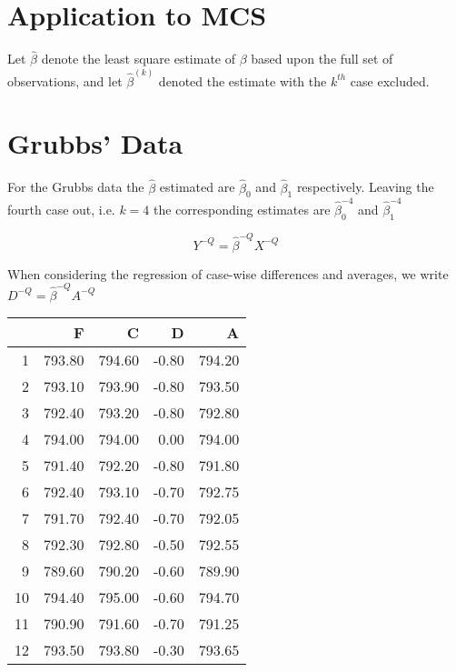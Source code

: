\documentclass[12pt, a4paper]{report}
\theoremstyle{plain}
\theoremstyle{definition}
\theoremstyle{remark}
\begin{document}

\section{Application to MCS} %

Let $\hat{\beta}$ denote the least square estimate of $\beta$
based upon the full set of observations, and let
$\hat{\beta}^{(k)}$ denoted the estimate with the $k^{th}$ case
excluded.


\section{Grubbs' Data} %

For the Grubbs data the $\hat{\beta}$ estimated are
$\hat{\beta}_{0}$ and $\hat{\beta}_{1}$ respectively. Leaving the
fourth case out, i.e. $k=4$ the corresponding estimates are
$\hat{\beta}_{0}^{-4}$ and $\hat{\beta}_{1}^{-4}$


\begin{equation}
Y^{-Q} = \hat{\beta}^{-Q}X^{-Q}
\end{equation}

When considering the regression of case-wise differences and averages, we write $D^{-Q} = \hat{\beta}^{-Q}A^{-Q}$


\newpage

\begin{table}[ht]
\begin{center}
\begin{tabular}{rrrrr}
  \hline
 & F & C & D & A \\
  \hline
1 & 793.80 & 794.60 & -0.80 & 794.20 \\
  2 & 793.10 & 793.90 & -0.80 & 793.50 \\
  3 & 792.40 & 793.20 & -0.80 & 792.80 \\
  4 & 794.00 & 794.00 & 0.00 & 794.00 \\
  5 & 791.40 & 792.20 & -0.80 & 791.80 \\
  6 & 792.40 & 793.10 & -0.70 & 792.75 \\
  7 & 791.70 & 792.40 & -0.70 & 792.05 \\
  8 & 792.30 & 792.80 & -0.50 & 792.55 \\
  9 & 789.60 & 790.20 & -0.60 & 789.90 \\
  10 & 794.40 & 795.00 & -0.60 & 794.70 \\
  11 & 790.90 & 791.60 & -0.70 & 791.25 \\
  12 & 793.50 & 793.80 & -0.30 & 793.65 \\
   \hline
\end{tabular}
\end{center}
\end{table}
\end{document}
